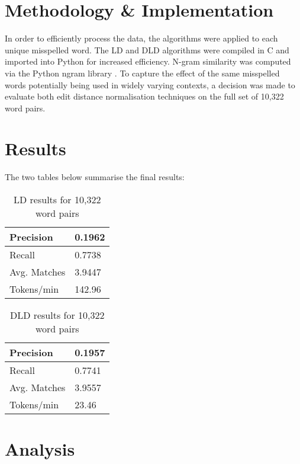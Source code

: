 \documentclass[11pt]{article}
\begin{document}
\section{Methodology \& Implementation}
In order to efficiently process the data, the algorithms were applied to each unique misspelled word.
The LD and DLD \cite{Jensen} algorithms were compiled in C and imported into Python for increased efficiency. N-gram
similarity was computed via the Python ngram library \cite{Poulter}. To capture the effect of the same misspelled words potentially being used in widely varying contexts, a decision was made to evaluate both edit distance normalisation techniques on the full set of 10,322 word pairs. 


\section{Results}
The two tables below summarise the final results:

\begin{table}[h]
\begin{center}
\begin{tabular}{|l|l|}
      \hline
      Precision & 0.1962\\
      \hline
      Recall & 0.7738\\
      \hline
      Avg. Matches & 3.9447\\
      \hline
      Tokens/min & 142.96\\
      \hline
\end{tabular}
\caption{LD results for 10,322 word pairs}\label{table1}
\end{center}
\end{table}


\begin{table}[h]
\begin{center}
\begin{tabular}{|l|l|}
      \hline
      Precision & 0.1957\\
      \hline
      Recall & 0.7741\\
      \hline
      Avg. Matches & 3.9557\\
      \hline
      Tokens/min & 23.46\\
      \hline
\end{tabular}
\caption{DLD results for 10,322 word pairs}\label{table2}
\end{center}
\end{table}

\section{Analysis}
\end{document}
